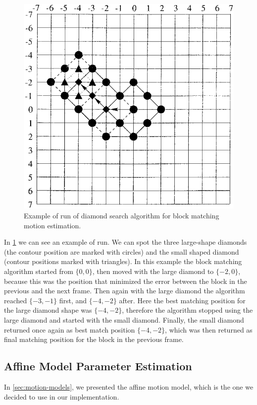 \begin{figure}
    \centering
    \includegraphics[width=.95\linewidth]{../assets/images/ds-exe.png}
    \caption{Example of run of diamond search algorithm for block matching motion estimation.}
    \label{fig:diamond-search-example}
\end{figure}

In \cref{fig:diamond-search-example} we can see an example of run. We can spot the three large-shape diamonds (the contour position are marked with circles) and the small shaped diamond (contour positions marked with triangles).
In this example the block matching algorithm started from $\{0,0\}$, then moved with the large diamond to $\{-2,0\}$, because this was the position that minimized the error between the block in the previous and the next frame. Then again with the large diamond the algorithm reached $\{-3,-1\}$ first, and $\{-4,-2\}$ after. Here the best matching position for the large diamond shape was $\{-4,-2\}$, therefore the algorithm stopped using the large diamond and started with the small diamond. Finally, the small diamond returned once again as best match position $\{-4,-2\}$, which was then returned as final matching position for the block in the previous frame.

\subsection{Affine Model Parameter Estimation}
In \cref{sec:motion-models}, we presented the affine motion model, which is the one we decided to use in our implementation.


